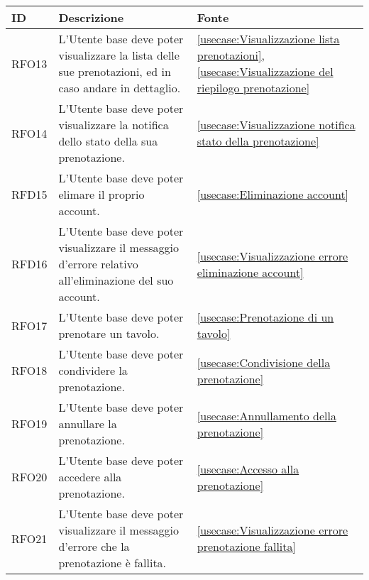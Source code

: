 \begin{table}[H]
	\renewcommand{\arraystretch}{1.5}
	\centering
	\begin{tabularx}{\textwidth}{l|X|p{2cm}}
		\textbf{ID} & \textbf{Descrizione}                                                                                           & \textbf{Fonte}                                                              \\
		\hline
		RFO13       & L'Utente base deve poter visualizzare la lista delle sue prenotazioni, ed in caso andare in dettaglio.          & \autoref{usecase:Visualizzazione lista prenotazioni}, \autoref{usecase:Visualizzazione del riepilogo prenotazione}                \\
		\hline
		RFO14       & L'Utente base deve poter visualizzare la notifica dello stato della sua prenotazione.                          & \autoref{usecase:Visualizzazione notifica stato della prenotazione}         \\
		\hline
		RFD15       & L'Utente base deve poter elimare il proprio account.                                                           & \autoref{usecase:Eliminazione account}                                      \\
		\hline
		RFD16       & L'Utente base deve poter visualizzare il messaggio d'errore relativo all'eliminazione del suo account.         & \autoref{usecase:Visualizzazione errore eliminazione account}               \\
		\hline
		RFO17       & L'Utente base deve poter prenotare un tavolo.                                                                  & \autoref{usecase:Prenotazione di un tavolo}                                 \\
		\hline
		RFO18       & L'Utente base deve poter condividere la prenotazione.                                                          & \autoref{usecase:Condivisione della prenotazione}                           \\
		\hline
		RFO19       & L'Utente base deve poter annullare la prenotazione.                                                            & \autoref{usecase:Annullamento della prenotazione}                           \\
		\hline
		RFO20       & L'Utente base deve poter accedere alla prenotazione.                                                           & \autoref{usecase:Accesso alla prenotazione}                                 \\
		\hline
		RFO21       & L'Utente base deve poter visualizzare il messaggio d'errore che la prenotazione è fallita.                     & \autoref{usecase:Visualizzazione errore prenotazione fallita}               \\

\end{tabularx}
\end{table}
